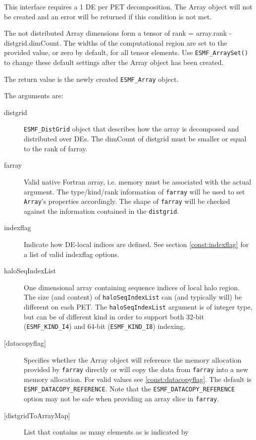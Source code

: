    This interface requires a 1 DE per PET decomposition. The Array object will 
   not be created and an error will be returned if this condition is not met. 
   
   The not distributed Array dimensions form a tensor of rank = array.rank - 
   distgrid.dimCount. The widths of the computational region are set to 
   the provided value, or zero by default, for all tensor elements. Use 
   {\tt ESMF\_ArraySet()} to change these default settings after the 
   Array object has been created. 
   
   The return value is the newly created {\tt ESMF\_Array} object. 
   
   The arguments are: 
   \begin{description} 
   \item[distgrid] 
   {\tt ESMF\_DistGrid} object that describes how the array is decomposed and 
   distributed over DEs. The dimCount of distgrid must be smaller or equal 
   to the rank of farray. 
   \item[farray] 
   Valid native Fortran array, i.e. memory must be associated with the 
   actual argument. The type/kind/rank information of {\tt farray} will be 
   used to set {\tt Array}'s properties accordingly. The shape of 
   {\tt farray} will be checked against the information contained in the 
   {\tt distgrid}. 
   \item[indexflag] 
   Indicate how DE-local indices are defined. See section 
   \ref{const:indexflag} for a list of valid indexflag options. 
   \item[haloSeqIndexList] 
   One dimensional array containing sequence indices of local halo region. 
   The size (and content) of {\tt haloSeqIndexList} can (and typically will) 
   be different on each PET. 
   The {\tt haloSeqIndexList} argument is of integer type, but can be of 
   different kind in order to support both 32-bit ({\tt ESMF\_KIND\_I4}) 
   and 64-bit ({\tt ESMF\_KIND\_I8}) indexing. 
   \item[{[datacopyflag]}] 
   Specifies whether the Array object will reference the memory allocation 
   provided by {\tt farray} directly or will copy the data from 
   {\tt farray} into a new memory allocation. For valid values see 
   \ref{const:datacopyflag}. The default is {\tt ESMF\_DATACOPY\_REFERENCE}. 
   Note that the {\tt ESMF\_DATACOPY\_REFERENCE} option may not be safe 
   when providing an array slice in {\tt farray}. 
   \item[{[distgridToArrayMap]}] 
   List that contains as many elements as is indicated by 

\end{description}
